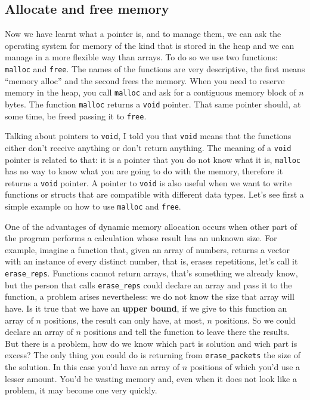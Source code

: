 \documentclass[a4paper]{article}
\begin{document}
\subsection{Allocate and free memory}
Now we have learnt what a pointer is, and to manage them, we can ask the
operating system for memory of the kind that is stored in the heap and we can
manage in a more flexible way than arrays. To do so we use two functions:
\verb!malloc! and \verb!free!. The names of the functions are very descriptive,
the first means ``memory alloc'' and the second frees the memory. When you need
to reserve memory in the heap, you call \texttt{malloc} and ask for a contiguous
memory block of $n$ bytes. The function \verb!malloc! returns a \verb!void!
pointer. That same pointer should, at some time, be freed passing it to
\texttt{free}.

Talking about pointers to \verb!void!, I told you that \verb!void! means that
the functions either don't receive anything or don't return anything. The
meaning of a \verb!void! pointer is related to that: it is a pointer that you do
not know what it is, \verb!malloc! has no way to know what you are going to do
with the memory, therefore it returns a \verb!void! pointer. A pointer to
\verb!void! is also useful when we want to write functions or structs that are
compatible with different data types. Let's see first a simple example on how to
use \verb!malloc! and \verb!free!.

One of the advantages of dynamic memory allocation occurs when other part of
the program performs a calculation whose result has an unknown size. For
example, imagine a function that, given an array of numbers, returns a vector
with an instance of every distinct number, that is, erases repetitions, let's
call it \verb!erase_reps!. Functions cannot return arrays, that's something we
already know, but the person that calls \verb!erase_reps! could declare an array
and pass it to the function, a problem arises nevertheless: we do not know
the size that array will have. Is it true that we have an \textbf{upper bound},
if we give to this function an array of $n$ positions, the result can only have,
at most, $n$ positions. So we could declare an array of $n$ positions
and tell the function to leave there the results. But there is a problem, how do
we know which part is solution and wich part is excess? The only thing you could
do is returning from \verb!erase_packets! the size of the solution. In this case
you'd have an array of $n$ positions of which you'd use a lesser amount.
You'd be wasting memory and, even when it does not look like a problem, it may
become one very quickly.
\end{document}

